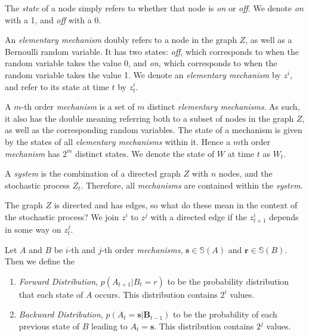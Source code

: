 \begin{definition}
	The \textit{state} of a node simply refers to whether that node is \textit{on} or \textit{off}. We denote \textit{on} with a 1, and \textit{off} with a 0.
\end{definition}

\begin{definition}
	\label{def:element}
	An \textit{elementary mechanism} doubly refers to a node in the graph $Z$, as well as a Bernoulli random variable. It has two states: \textit{off}, which corresponds to when the random variable takes the value 0, and \textit{on}, which corresponds to when the random variable takes the value 1. We denote an \textit{elementary mechanism} by $z^i$, and refer to its state at time $t$ by $z^i_t$.
\end{definition}
	
\begin{definition}
	\label{def:mech}
	A $m$-th order \textit{mechanism} is a set of $m$ distinct \textit{elementary mechanisms}. As such, it also has the double meaning referring both to a subset of nodes in the graph $Z$, as well as the corresponding random variables. The state of a mechanism is given by the states of all \textit{elementary mechanisms} within it. Hence a $m$th order \textit{mechanism} has $2^m$ distinct states. We denote the state of $W$ at time $t$ as $W_t$.
\end{definition}

\begin{definition}
	\label{def:system}
	A \textit{system} is the combination of a directed graph $Z$ with $n$ nodes, and the stochastic process $Z_t$. Therefore, all \textit{mechanisms} are contained within the \textit{system}.
\end{definition}
	
The graph $Z$ is directed and has edges, so what do these mean in the context of the stochastic process? We join $z^i$ to $z^j$ with a directed edge if the $z^i_{t+1}$ depends in some way on $z^j_t$. 

\begin{definition}
	\label{def:distributions}
	Let $A$ and $B$ be $i$-th and $j$-th order \textit{mechanisms}, $\mathbf{s} \in \mathbb{S}(A)$ and $\mathbf{r} \in \mathbb{S}(B)$. Then we define the
	\begin{enumerate}
		\item \textit{Forward Distribution}, $p(A_{t+1}|B_t = r)$ to be the probability distribution that each state of $A$ occurs. This distribution contains $2^i$ values.
		\item \textit{Backward Distribution}, $p(A_{t}=\mathbf{s}|\mathbf{B}_{t-1})$ to be the probability of each previous state of $B$ leading to $A_t = \mathbf{s}$. This distribution contains $2^j$ values.
	\end{enumerate}
\end{definition}



